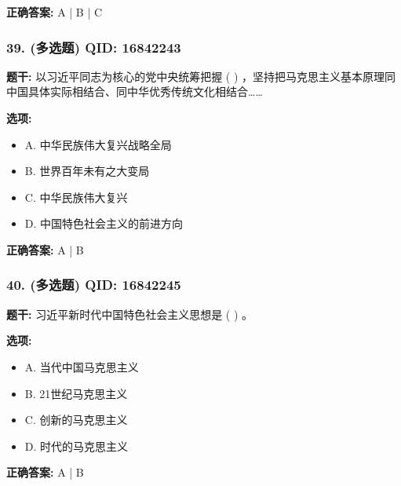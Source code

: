 \documentclass[12pt,UTF8]{ctexart}
\begin{document}
\textbf{正确答案:}
A | B | C

\vspace{0.3em}\hrulefill\vspace{0.7em}

\subsubsection*{39. (多选题) \small QID: 16842243}

\textbf{题干:}
以习近平同志为核心的党中央统筹把握 ( ) ，坚持把马克思主义基本原理同中国具体实际相结合、同中华优秀传统文化相结合……

\textbf{选项:}
\begin{itemize}[leftmargin=*]

  \item A. 中华民族伟大复兴战略全局

  \item B. 世界百年未有之大变局

  \item C. 中华民族伟大复兴

  \item D. 中国特色社会主义的前进方向

\end{itemize}

\textbf{正确答案:}
A | B

\vspace{0.3em}\hrulefill\vspace{0.7em}

\subsubsection*{40. (多选题) \small QID: 16842245}

\textbf{题干:}
习近平新时代中国特色社会主义思想是 ( ) 。

\textbf{选项:}
\begin{itemize}[leftmargin=*]

  \item A. 当代中国马克思主义

  \item B. 21世纪马克思主义

  \item C. 创新的马克思主义

  \item D. 时代的马克思主义

\end{itemize}

\textbf{正确答案:}
A | B
\end{document}
